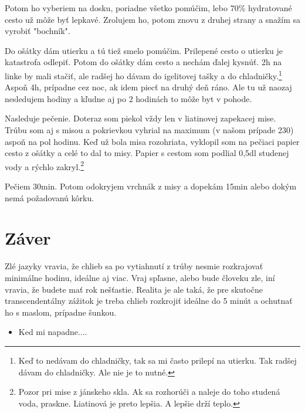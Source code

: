 \documentclass[a4paper,12pt]{article}
\begin{document}
Potom ho vyberiem na dosku, poriadne všetko pomúčim, lebo 70\% hydratované cesto už môže byť lepkavé. Zrolujem ho, potom znovu z druhej strany a snažím sa vyrobiť "bochník".

Do ošátky dám utierku a tú tiež smelo pomúčim. Prilepené cesto o utierku je katastrofa odlepiť. Potom do ošátky dám cesto a nechám ďalej kysnúť. 2h na linke by mali stačiť, ale radšej ho dávam do igelitovej tašky a do chladničky.\footnote{Keď to nedávam do chladničky, tak sa mi často prilepí na utierku. Tak radšej dávam do chladničky. Ale nie je to nutné.} Aspoň 4h, prípadne cez noc, ak idem piecť na druhý deň ráno. Ale tu už naozaj nesledujem hodiny a kľudne aj po 2 hodinách to môže byt v pohode.

Nasleduje pečenie. Doteraz som piekol vždy len v liatinovej zapekacej mise. Trúbu som aj s misou a pokrievkou vyhrial na maximum (v našom prípade 230) aspoň na pol hodinu. Keď už bola misa rozohriata, vyklopil som na pečiaci papier cesto z ošátky a celé to dal to misy. Papier s cestom som podlial 0,5dl studenej vody a rýchlo zakryl.\footnote{Pozor pri mise z jánskeho skla. Ak sa rozhorúči a naleje do toho studená voda, praskne. Liatinová je preto lepšia. A lepšie drží teplo.}

Pečiem 30min. Potom odokryjem vrchnák z misy a dopekám 15min alebo dokým nemá požadovanú kôrku.


\section{Záver}
Zlé jazyky vravia, že chlieb sa po vytiahnutí z trúby nesmie rozkrajovať minimálne hodinu, ideálne aj viac. Vraj spľasne, alebo bude človeku zle, iní vravia, že budete mať rok nešťastie. Realita je ale taká, že pre skutočne transcendentálny zážitok je treba chlieb rozkrojiť ideálne do 5 minút a ochutnať ho s maslom, prípadne šunkou.

\begin{tcolorbox}[colframe=green!50!black, colback=green!5!white, title=Tipy na Pečenie]
    \begin{itemize}
        \item Ked mi napadne....
    \end{itemize}
\end{tcolorbox}
\end{document}
